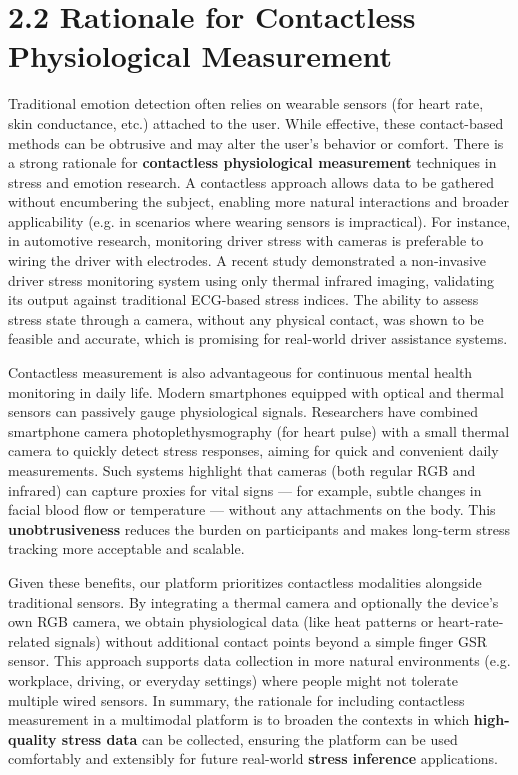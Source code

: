 \section{2.2 Rationale for Contactless Physiological Measurement}

Traditional emotion detection often relies on wearable sensors (for
heart rate, skin conductance, etc.) attached to the user. While
effective, these contact-based methods can be obtrusive and may alter
the user's behavior or comfort. There is a strong rationale for
\textbf{contactless physiological measurement} techniques in stress and
emotion research. A contactless approach allows data to be gathered
without encumbering the subject, enabling more natural interactions and
broader applicability (e.g. in scenarios where wearing sensors is
impractical). For instance, in automotive research, monitoring driver
stress with cameras is preferable to wiring the driver with electrodes.
A recent study demonstrated a non-invasive driver stress monitoring
system using only thermal infrared imaging, validating its output
against traditional ECG-based stress
indices\cite{DriverStressThermal2020}.
The ability to assess stress state through a camera, without any
physical contact, was shown to be feasible and accurate, which is
promising for real-world driver assistance systems.

Contactless measurement is also advantageous for continuous mental
health monitoring in daily life. Modern smartphones equipped with
optical and thermal sensors can passively gauge physiological signals.
Researchers have combined smartphone camera photoplethysmography (for
heart pulse) with a small thermal camera to quickly detect stress
responses, aiming for quick and convenient daily
measurements\cite{GSRFacialThermal2021}.
Such systems highlight that cameras (both regular RGB and infrared) can
capture proxies for vital signs --- for example, subtle changes in facial
blood flow or temperature --- without any attachments on the body. This
\textbf{unobtrusiveness} reduces the burden on participants and makes
long-term stress tracking more acceptable and scalable.

Given these benefits, our platform prioritizes contactless modalities
alongside traditional sensors. By integrating a thermal camera and
optionally the device's own RGB camera, we obtain physiological data
(like heat patterns or heart-rate-related signals) without additional
contact points beyond a simple finger GSR sensor. This approach supports
data collection in more natural environments (e.g. workplace, driving,
or everyday settings) where people might not tolerate multiple wired
sensors. In summary, the rationale for including contactless measurement
in a multimodal platform is to broaden the contexts in which
\textbf{high-quality stress data} can be collected, ensuring the platform can
be used comfortably and extensibly for future real-world \textbf{stress
inference} applications.

